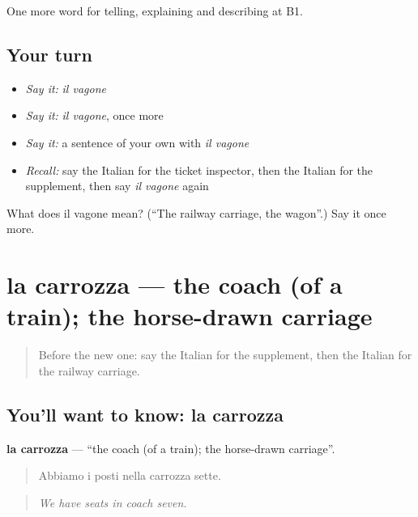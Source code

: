 \begin{grammarlens}[title={What you've built}]
One more word for telling, explaining and describing at B1.
\end{grammarlens}

\subsection*{Your turn}
\begin{itemize}
\raggedright
  \item \emph{Say it:} \emph{il vagone}
  \item \emph{Say it:} \emph{il vagone}, once more
  \item \emph{Say it:} a sentence of your own with \emph{il vagone}
  \item \emph{Recall:} say the Italian for the ticket inspector, then the Italian for the supplement, then say \emph{il vagone} again
\end{itemize}

\begin{tcolorbox}[breakable,colback=teal!4,colframe=teal!35!black,title={Before you move on}]
What does il vagone mean? (\textquotedblleft{}The railway carriage, the wagon\textquotedblright{}.) Say it once more.
\end{tcolorbox}
\section[la carrozza]{la carrozza — the coach (of a train); the horse-drawn carriage}

\label{lesson:IT-C419-carrozza}



\begin{quote}
Before the new one: say the Italian for the supplement, then the Italian for the railway carriage.
\end{quote}

\subsection*{You'll want to know: la carrozza}
\textbf{la carrozza} — \textquotedblleft{}the coach (of a train); the horse-drawn carriage\textquotedblright{}.

\begin{quote}
Abbiamo i posti nella carrozza sette.
\end{quote}

\begin{quote}
\emph{We have seats in coach seven.}
\end{quote}

